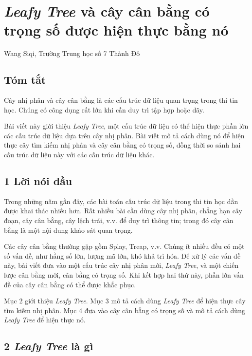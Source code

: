 \documentclass[11pt]{article}
\begin{document}
\section{\emph{Leafy Tree} và cây cân bằng có trọng số được hiện thực bằng nó}

\begin{center}
Wang Siqi, Trường Trung học số 7 Thành Đô
\end{center}

\subsection*{Tóm tắt}

Cây nhị phân và cây cân bằng là các cấu trúc dữ liệu quan trọng trong thi tin
học. Chúng có công dụng rất lớn khi cần duy trì tập hợp hoặc dãy.

Bài viết này giới thiệu \emph{Leafy Tree}, một cấu trúc dữ liệu có thể hiện
thực phần lớn các cấu trúc dữ liệu dựa trên cây nhị phân. Bài viết mô tả cách
dùng nó để hiện thực cây tìm kiếm nhị phân và cây cân bằng có trọng số, đồng
thời so sánh hai cấu trúc dữ liệu này với các cấu trúc dữ liệu khác.

\subsection*{1 Lời nói đầu}

Trong những năm gần đây, các bài toán cấu trúc dữ liệu trong thi tin học dần
được khai thác nhiều hơn. Rất nhiều bài cần dùng cây nhị phân, chẳng hạn cây
đoạn, cây cân bằng, cây lệch trái, v.v. để duy trì thông tin; trong đó cây cân
bằng là một nội dung khảo sát quan trọng.

Các cây cân bằng thường gặp gồm Splay, Treap, v.v. Chúng ít nhiều đều có một số
vấn đề, như hằng số lớn, lượng mã lớn, khó khả trì hóa. Để xử lý các vấn đề
này, bài viết đưa vào một cấu trúc cây nhị phân mới, \emph{Leafy Tree}, và một
chiến lược cân bằng mới, cân bằng có trọng số. Khi kết hợp hai thứ này, phần
lớn vấn đề của cây cân bằng có thể được khắc phục.

Mục 2 giới thiệu \emph{Leafy Tree}. Mục 3 mô tả cách dùng \emph{Leafy Tree} để
hiện thực cây tìm kiếm nhị phân. Mục 4 đưa vào cây cân bằng có trọng số và mô
tả cách dùng \emph{Leafy Tree} để hiện thực nó.

\subsection*{2 \emph{Leafy Tree} là gì}
\end{document}

